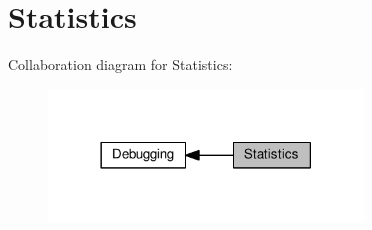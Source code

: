 \hypertarget{group__lwip__opts__stats}{}\section{Statistics}
\label{group__lwip__opts__stats}
Collaboration diagram for Statistics\+:
\nopagebreak
\begin{figure}[H]
\begin{center}
\leavevmode
\includegraphics[width=237pt]{group__lwip__opts__stats}
\end{center}
\end{figure}
